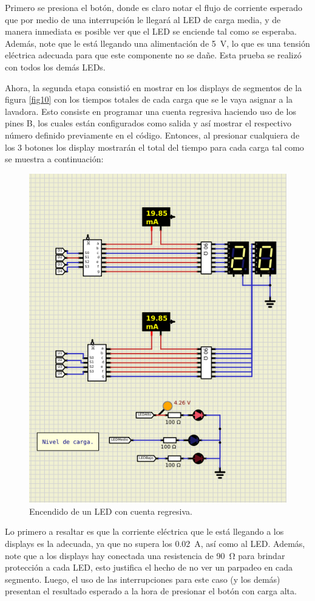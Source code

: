 Primero se presiona el botón, donde es claro notar el flujo de corriente esperado que por medio de una interrupción le llegará al LED de carga media, y de manera inmediata es posible ver que el LED se enciende tal como se esperaba. Además, note que le está llegando una alimentación de \SI{5}{\volt}, lo que es una tensión eléctrica adecuada para que este componente no se dañe. Esta prueba se realizó con todos los demás LEDs.\par
Ahora, la segunda etapa consistió en mostrar en los displays de segmentos de la figura \ref{fig10} con los tiempos totales de cada carga que se le vaya asignar a la lavadora. Esto consiste en programar una cuenta regresiva haciendo uso de los pines B, los cuales están configurados como salida y así mostrar el respectivo número definido previamente en el código. Entonces, al presionar cualquiera de los 3 botones los display mostrarán el total del tiempo para cada carga tal como se muestra a continuación:
\begin{figure}[H]
        \centering
        \includegraphics[width=.7\linewidth]{Imagenes/8.png}
        \caption{Encendido de un LED con cuenta regresiva.}
        \label{fig14}
    \end{figure}
Lo primero a resaltar es que la corriente eléctrica que le está llegando a los displays es la adecuada, ya que no supera los \SI{0.02}{\A}, así como al LED. Además, note que a los displays hay conectada una resistencia de \SI{90}{\ohm} para brindar protección a cada LED, esto justifica el hecho de no ver un parpadeo en cada segmento. Luego, el uso de las interrupciones para este caso (y los demás) presentan el resultado esperado a la hora de presionar el botón con carga alta.\par
